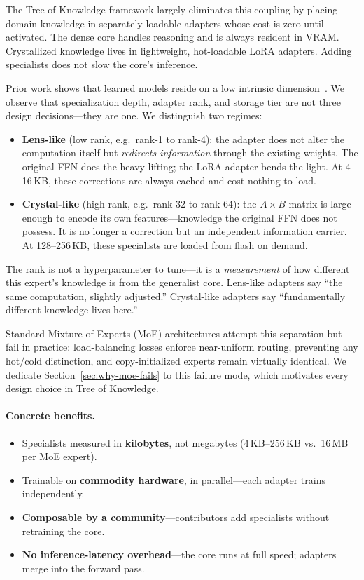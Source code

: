 \documentclass{article}
\newcommand{\tok}{Tree of Knowledge}
\begin{document}
The \tok{} framework largely eliminates this coupling by placing domain knowledge in separately-loadable adapters whose cost is zero until activated. The dense core handles reasoning and is always resident in VRAM. Crystallized knowledge lives in lightweight, hot-loadable LoRA adapters. Adding specialists does not slow the core's inference.

Prior work shows that learned models reside on a low intrinsic
dimension~\cite{li2018intrinsic,aghajanyan2021intrinsic}. We observe that
specialization depth, adapter rank, and storage tier are not three design
decisions---they are one. We distinguish two regimes:

\begin{itemize}[nosep,leftmargin=1em]
\item \textbf{Lens-like} (low rank, e.g.\ rank-1 to rank-4): the adapter does not alter the computation itself but \emph{redirects information} through the existing weights. The original FFN does the heavy lifting; the LoRA adapter bends the light. At 4--16\,KB, these corrections are always cached and cost nothing to load.
\item \textbf{Crystal-like} (high rank, e.g.\ rank-32 to rank-64): the $A \times B$ matrix is large enough to encode its own features---knowledge the original FFN does not possess. It is no longer a correction but an independent information carrier. At 128--256\,KB, these specialists are loaded from flash on demand.
\end{itemize}

The rank is not a hyperparameter to tune---it is a \emph{measurement} of how different this expert's knowledge is from the generalist core. Lens-like adapters say ``the same computation, slightly adjusted.'' Crystal-like adapters say ``fundamentally different knowledge lives here.''



Standard Mixture-of-Experts (MoE) architectures attempt this separation but
fail in practice: load-balancing losses enforce near-uniform routing, preventing
any hot/cold distinction, and copy-initialized experts remain virtually
identical. We dedicate Section~\ref{sec:why-moe-fails} to this failure mode,
which motivates every design choice in \tok{}.

\paragraph{Concrete benefits.}
\begin{itemize}
    \item Specialists measured in \textbf{kilobytes}, not megabytes (4\,KB--256\,KB vs.\ 16\,MB per MoE expert).
    \item Trainable on \textbf{commodity hardware}, in parallel---each adapter trains independently.
    \item \textbf{Composable by a community}---contributors add specialists without retraining the core.
    \item \textbf{No inference-latency overhead}---the core runs at full speed; adapters merge into the forward pass.
\end{itemize}
\end{document}
